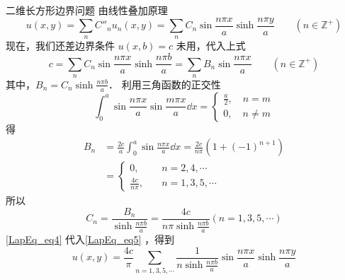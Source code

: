 \begin{example}{二维长方形边界问题}
由线性叠加原理
\begin{equation}\label{LapEq_eq5}
u(x,y)=\sum_n C''_n u_n(x,y)=\sum_n C_n\sin\frac{n\pi x}{a}\sinh\frac{n\pi y}{a} \qquad  (n\in\mathbb{Z^+})
\end{equation}
现在，我们还差边界条件 $u(x,b)=c$ 未用，代入上式
\begin{equation}
c=\sum_n C_n\sin\frac{n\pi x}{a}\sinh\frac{n\pi b}{a}=\sum_n B_n\sin\frac{n\pi x}{a} \qquad (n\in\mathbb{Z^+})
\end{equation}
其中，$B_n=C_n\sinh \frac{n\pi b}{a}$．
利用三角函数的正交性
\begin{equation}
\int_0^a\sin\frac{n\pi x}{a}\sin\frac{m\pi x}{a}\dd x=\left\{\begin{aligned}
\frac{a}{2},\quad  n=m\\
0,\quad n\neq m
\end{aligned}\right.
\end{equation}
得
\begin{equation}
\begin{aligned}
B_n&=\frac{2c}{a}\int_0^a\sin\frac{n\pi x}{a}\dd x=\frac{2c}{n\pi}(1+(-1)^{n+1})\\
&=\left\{\begin{aligned}
0,&\quad n=2,4,\cdots\\
\frac{4c}{n\pi},&\quad n=1,3,5,\cdots
\end{aligned}\right.
\end{aligned}
\end{equation}
所以
\begin{equation}\label{LapEq_eq4}
C_n=\frac{B_n}{\sinh \frac{n\pi b}{a}}=\frac{4c}{n\pi\sinh \frac{n\pi b}{a}}(n=1,3,5,\cdots)
\end{equation}
\autoref{LapEq_eq4} 代入\autoref{LapEq_eq5} ，得到
\begin{equation}
u(x,y)=\frac{4c}{\pi}\sum_{n=1,3,5,\cdots} \frac{1}{n\sinh \frac{n\pi b}{a}}\sin\frac{n\pi x}{a}\sinh\frac{n\pi y}{a}
\end{equation}
\end{example}
